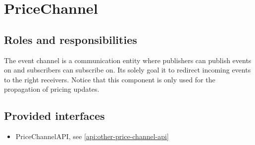 \section{PriceChannel}
\label{element:price-channel}

\subsection{Roles and responsibilities}

\npar The event channel is a communication entity where publishers can publish
events on and subscribers can subscribe on. Its solely goal it to redirect
incoming events to the right receivers. Notice that this component is only used
for the propagation of pricing updates.

\subsection{Provided interfaces}

\begin{itemize}
  \item PriceChannelAPI, see \ref{api:other-price-channel-api}
\end{itemize}